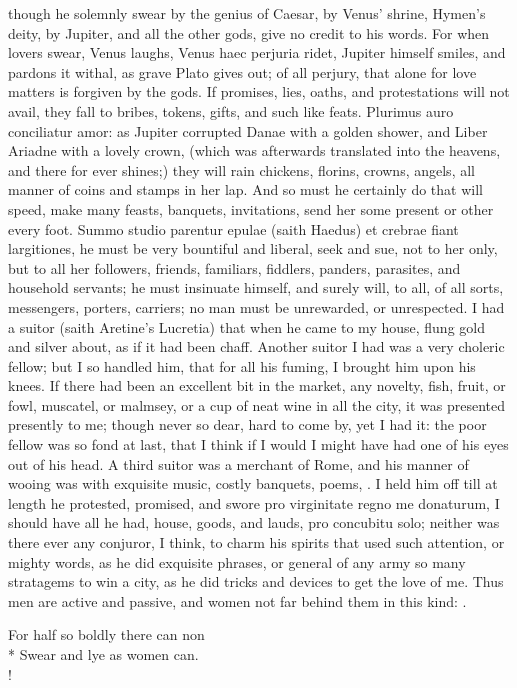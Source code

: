 though he solemnly swear by the genius of Caesar, by Venus' shrine,
Hymen's deity, by Jupiter, and all the other gods, give no credit to
his words. For when lovers swear, Venus laughs, Venus haec perjuria
ridet, Jupiter himself smiles, and pardons it withal, as grave
Plato gives out; of all perjury, that alone for love matters is
forgiven by the gods. If promises, lies, oaths, and protestations will
not avail, they fall to bribes, tokens, gifts, and such like feats.
Plurimus auro conciliatur amor: as Jupiter corrupted Danae with a
golden shower, and Liber Ariadne with a lovely crown, (which was
afterwards translated into the heavens, and there for ever shines;)
they will rain chickens, florins, crowns, angels, all manner of coins
and stamps in her lap. And so must he certainly do that will speed,
make many feasts, banquets, invitations, send her some present or other
every foot. Summo studio parentur epulae (saith Haedus) et
crebrae fiant largitiones, he must be very bountiful and liberal, seek
and sue, not to her only, but to all her followers, friends, familiars,
fiddlers, panders, parasites, and household servants; he must insinuate
himself, and surely will, to all, of all sorts, messengers, porters,
carriers; no man must be unrewarded, or unrespected. I had a suitor
(saith Aretine's Lucretia) that when he came to my house, flung
gold and silver about, as if it had been chaff. Another suitor I had
was a very choleric fellow; but I so handled him, that for all his
fuming, I brought him upon his knees. If there had been an excellent
bit in the market, any novelty, fish, fruit, or fowl, muscatel, or
malmsey, or a cup of neat wine in all the city, it was presented
presently to me; though never so dear, hard to come by, yet I had it:
the poor fellow was so fond at last, that I think if I would I might
have had one of his eyes out of his head. A third suitor was a merchant
of Rome, and his manner of wooing was with exquisite music,
costly banquets, poems, \etc{}. I held him off till at length he protested,
promised, and swore pro virginitate regno me donaturum, I should have
all he had, house, goods, and lauds, pro concubitu solo; neither
was there ever any conjuror, I think, to charm his spirits that used
such attention, or mighty words, as he did exquisite phrases, or
general of any army so many stratagems to win a city, as he did tricks
and devices to get the love of me. Thus men are active and passive, and
women not far behind them in this kind: .
%
{\gothfont%
\begin{versewithlinenos}{2}{1}{1}%
For half so boldly there can non\\*
Swear and lye as women can.\\!
\end{versewithlinenos}%
}%

